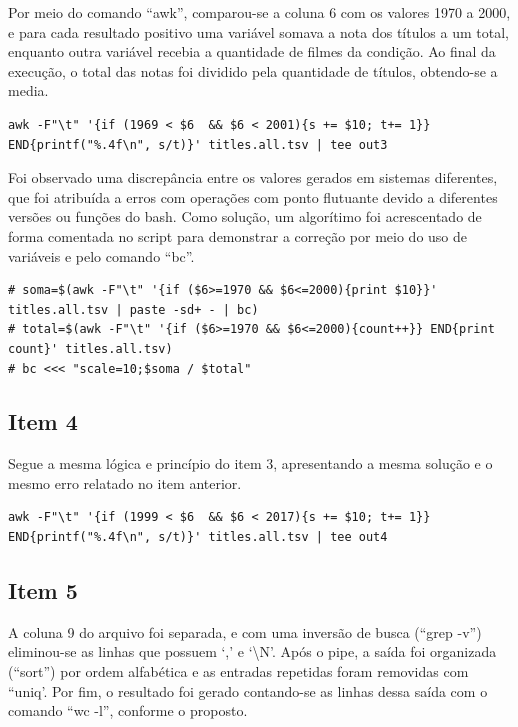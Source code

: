 \documentclass[12pt]{article}
\begin{document}
Por meio do comando ``awk'', comparou-se a coluna 6 com os valores 1970 a 2000, e para cada resultado positivo uma variável somava a nota dos títulos a um total, enquanto outra variável recebia a quantidade de filmes da condição. Ao final da execução, o total das notas foi dividido pela quantidade de títulos, obtendo-se a media.

\begin{verbatim}
awk -F"\t" '{if (1969 < $6  && $6 < 2001){s += $10; t+= 1}} END{printf("%.4f\n", s/t)}' titles.all.tsv | tee out3
\end{verbatim}

Foi observado uma discrepância entre os valores gerados em sistemas diferentes, que foi atribuída a erros com operações com ponto flutuante devido a diferentes versões ou funções do bash. Como solução, um algorítimo foi acrescentado de forma comentada no script para demonstrar a correção por meio do uso de variáveis e pelo comando ``bc''.

\begin{verbatim}
# soma=$(awk -F"\t" '{if ($6>=1970 && $6<=2000){print $10}}' titles.all.tsv | paste -sd+ - | bc) 
# total=$(awk -F"\t" '{if ($6>=1970 && $6<=2000){count++}} END{print count}' titles.all.tsv)
# bc <<< "scale=10;$soma / $total"
\end{verbatim}

\subsection*{Item 4}

Segue a mesma lógica e princípio do item 3, apresentando a mesma solução e o mesmo erro relatado no item anterior.

\begin{verbatim}
awk -F"\t" '{if (1999 < $6  && $6 < 2017){s += $10; t+= 1}} END{printf("%.4f\n", s/t)}' titles.all.tsv | tee out4
\end{verbatim}

\subsection*{Item 5}

A coluna 9 do arquivo foi separada, e com uma inversão de busca (``grep -v'') eliminou-se as linhas que possuem `,' e `\textbackslash	N'. Após o pipe, a saída foi organizada (``sort'') por ordem alfabética e as entradas repetidas foram removidas com ``uniq'. Por fim, o resultado foi gerado contando-se as linhas dessa saída com o comando ``wc -l'', conforme o proposto.
\end{document}

